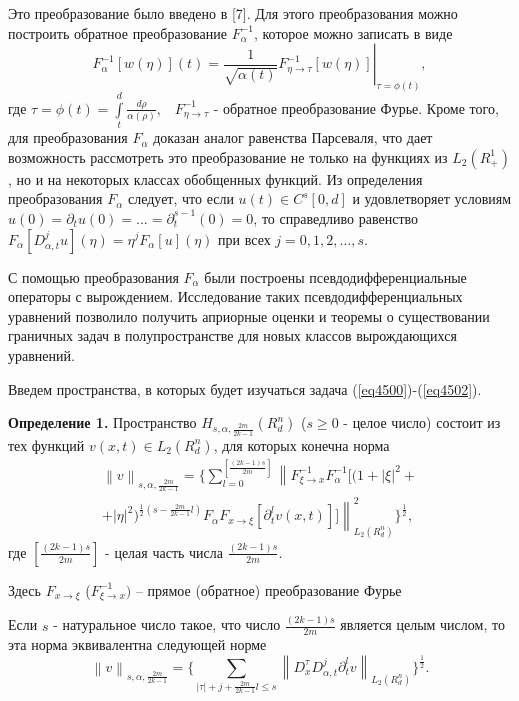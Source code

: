Это преобразование было введено в [7]. Для этого преобразования можно
построить обратное преобразование $F_\alpha ^{ - 1} $, которое можно
записать в виде
$$F_\alpha ^{ - 1} [w(\eta )](t) = \left. {\frac{1}{\sqrt
{\alpha (t)} }F_{\eta \to \tau }^{ - 1} [w(\eta )]} \right|_{\tau = \phi
(t)} ,$$ где $\tau = \phi (t) = \int\limits_t^d {\frac{d\rho }{\alpha (\rho
)}} ,\,\,\,\,\,F_{\eta \to \tau }^{ - 1} $ - обратное преобразование Фурье.
Кроме того, для преобразования $F_\alpha $ доказан аналог равенства
Парсеваля, что дает возможность рассмотреть это преобразование не только на
функциях из $L_2 (R_ + ^1 )$, но и на некоторых классах обобщенных функций.
Из определения преобразования $F_\alpha $ следует, что если $u\left( t
\right) \in C^s\left[ {0,d} \right]$ и удовлетворяет условиям $u\left( 0
\right) = \partial _t u\left( 0 \right) = ... = \partial _t^{s - 1} \left( 0
\right) = 0$,
то справедливо равенство $F_\alpha \left[ {D_{\alpha ,t}^j u} \right]\left(
\eta \right) = \eta ^jF_\alpha \left[ u \right]\left( \eta \right)$ при всех
$j = 0,1,2,...,s$.

С помощью преобразования $F_\alpha $ были построены псевдодифференциальные
операторы с вырождением. Исследование таких псевдодифференциальных уравнений
позволило получить априорные оценки и теоремы о существовании граничных
задач в полупространстве для новых классов вырождающихся уравнений.

Введем пространства, в которых будет изучаться задача (\ref{eq4500})-(\ref{eq4502}).

\textbf{Определение 1.} Пространство $H_{s,\alpha ,\frac{2m}{2k - 1}} (R_d^n
)$ ($s \ge 0$ - целое число) состоит из тех функций $v(x,t) \in L_2 (R_d^n
)$, для которых конечна норма
\begin{multline*}
	\left\| v \right\|_{s,\alpha ,\frac{2m}{2k - 1}} =
	\{
		\sum\limits_{l = 0}^{[\frac{(2k - 1)s}{2m}]}
		\left\|
			F_{\xi \to x}^{ - 1} F_\alpha ^{ - 1}
			[(1 + \left| \xi \right|^2 +
		\right. \\ + \left.
			\left| \eta \right|^2 )^{\frac{1}{2}(s -
			\frac{2m}{2k - 1}l)}F_\alpha F_{x \to \xi } [\partial _t^l v(x,t)]]
		\right\|_{L_2 (R_d^n )}^2
	\}
	^\frac{1}{2} ,
\end{multline*}
где $[\frac{(2k - 1)s}{2m}]$ - целая часть числа $\frac{(2k - 1)s}{2m}$.

Здесь $F_{x \to \xi } $ ($F_{\xi \to x}^{ - 1} )$ -- прямое (обратное)
преобразование Фурье

Если $s$ - натуральное число такое, что число $\frac{(2k - 1)s}{2m}$
является целым числом, то эта норма эквивалентна следующей норме
\[
\left\| v \right\|_{s,\alpha ,\frac{2m}{2k - 1}} = \{\sum\limits_{\left|
\tau \right| + j + \frac{2m}{2k - 1}l \le s} {\left\| {D_x^\tau D_{\alpha
,t}^j \partial _t^l v} \right\|} _{L_2 (R_d^n )} \}^{\frac{1}{2}}.
\]



